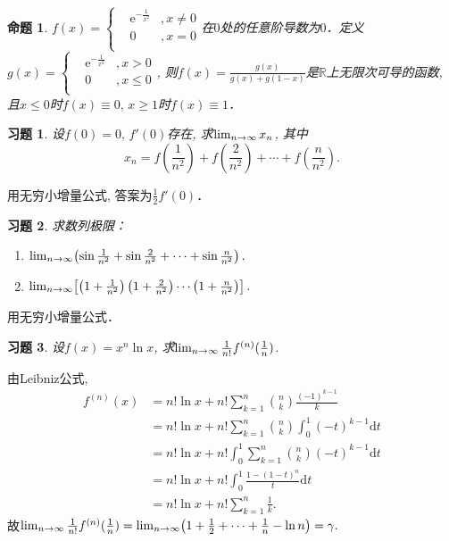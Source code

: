 \documentclass[11pt,a4paper]{ctexart}
\makeatletter
\theoremstyle{thmseries} %
\newtheorem{prop}{命题}[section]
\theoremstyle{exerseries}
\newtheorem{exer}{习题}[section]
\renewenvironment{proof}[1][\proofname]{\par
  \pushQED{\qed}%
  \normalfont \topsep6\p@\@plus6\p@\relax
  \trivlist
  \item[\hskip\labelsep
        \itshape
    #1\@addpunct{}]\ignorespaces
}{%
  \popQED\endtrivlist\@endpefalse
}
\newenvironment{sol}{\begin{proof}[\bfseries\upshape 解\quad]}{\end{proof}}
\newcommand{\bra}[1]{\mathopen{}\left(#1\right)}
\newcommand{\sbra}[1]{\mathopen{}\left[#1\right]}
\newcommand{\R}{\mathbb{R}}
\renewcommand{\d}{\mathrm{d}}
\newcommand{\e}{\mathrm{e}}
\def \nti {\mathnormal{n}\to\infty}
\makeatother
\begin{document}
\begin{prop}
	$f(x)=\left\{\begin{aligned}
		&\e^{-\frac{1}{x^2}}&,x\neq0\\
		&0&,x=0\\
	\end{aligned}\right.$在$0$处的任意阶导数为$0$．定义$g(x)=\left\{\begin{aligned}
		&\e^{-\frac{1}{x^2}}&,x>0\\
		&0&,x\leq0\\
	\end{aligned}\right.$, 则$f(x)=\frac{g(x)}{g(x)+g(1-x)}$是$\R$上无限次可导的函数, 且$x\leq0$时$f(x)\equiv0,\,x\geq1$时$f(x)\equiv1$．
\end{prop}

\begin{exer}
	设$f(0)=0,\,f'(0)$存在, 求$\lim_{\nti}x_n$, 其中
	\[x_n=f\bra{\frac{1}{n^2}}+f\bra{\frac{2}{n^2}}+\cdots+f\bra{\frac{n}{n^2}}.\]
\end{exer}
\begin{sol}
	用无穷小增量公式, 答案为$\frac{1}{2}f'(0)$．
\end{sol}

\begin{exer}
	求数列极限：
	\begin{enumerate}
		\item $\lim_{\nti}\bra{\sin\frac{1}{n^2}+\sin\frac{2}{n^2}+\cdots+\sin\frac{n}{n^2}}.$
		\item $\lim_{\nti}\sbra{\bra{1+\frac{1}{n^2}}\bra{1+\frac{2}{n^2}}\cdots\bra{1+\frac{n}{n^2}}}.$
	\end{enumerate}
\end{exer}
\begin{sol}
	用无穷小增量公式．
\end{sol}

\begin{exer}
	设$f(x)=x^n\ln x$, 求$\lim_{\nti}\frac{1}{n!}f^{(n)}(\frac{1}{n})$.
\end{exer}
\begin{sol}
	由Leibniz公式, 
	\begin{align*}
		f^{(n)}(x)&=n!\ln x+n!\sum_{k=1}^{n}\binom{n}{k}\frac{(-1)^{k-1}}{k}\\
		&=n!\ln x+n!\sum_{k=1}^{n}\binom{n}{k}\int_{0}^{1}(-t)^{k-1}\d t\\
		&=n!\ln x+n!\int_{0}^{1}\sum_{k=1}^{n}\binom{n}{k}(-t)^{k-1}\d t\\
		&=n!\ln x+n!\int_{0}^{1}\frac{1-(1-t)^n}{t}\d t\\
		&=n!\ln x+n!\sum_{k=1}^{n}\frac{1}{k}.
	\end{align*}
	故$\lim_{\nti}\frac{1}{n!}f^{(n)}(\frac{1}{n})=\lim_{\nti}\bra{1+\frac{1}{2}+\cdots+\frac{1}{n}-\ln n}=\gamma.$
\end{sol}
\end{document}
